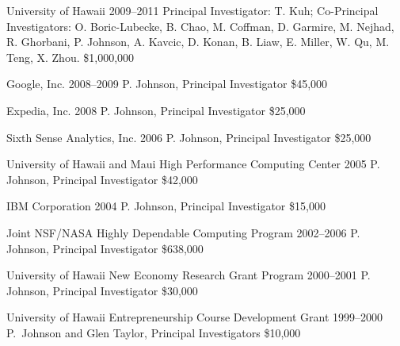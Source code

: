 \documentclass[11pt,letterpaper,sans]{moderncv} %
\begin{document}
        {University of Hawaii} %
        {2009--2011} %
        {Principal Investigator: T. Kuh; Co-Principal Investigators:  O. Boric-Lubecke, B. Chao, M. Coffman, D. Garmire, M. Nejhad, R. Ghorbani, P. Johnson, A. Kavcic, D. Konan, B. Liaw, E. Miller, W. Qu, M. Teng, X. Zhou.}  %
        {\$1,000,000} %

        {Google, Inc.} %
        {2008--2009} %
        {P. Johnson, Principal Investigator}  %
        {\$45,000} %

        {Expedia, Inc.} %
        {2008} %
        {P. Johnson, Principal Investigator}  %
        {\$25,000} %

        {Sixth Sense Analytics, Inc.} %
        {2006} %
        {P. Johnson, Principal Investigator}  %
        {\$25,000} %

        {University of Hawaii and Maui High Performance Computing Center} %
        {2005} %
        {P. Johnson, Principal Investigator}  %
        {\$42,000} %

        {IBM Corporation} %
        {2004} %
        {P. Johnson, Principal Investigator}  %
        {\$15,000} %

        {Joint NSF/NASA Highly Dependable Computing Program} %
        {2002--2006} %
        {P. Johnson, Principal Investigator}  %
        {\$638,000} %

        {University of Hawaii New Economy Research Grant Program} %
        {2000--2001} %
        {P. Johnson, Principal Investigator}  %
        {\$30,000} %

        {University of Hawaii Entrepreneurship Course Development Grant} %
        {1999--2000} %
        {P.~Johnson and Glen Taylor, Principal Investigators}  %
        {\$10,000} %
\end{document}
